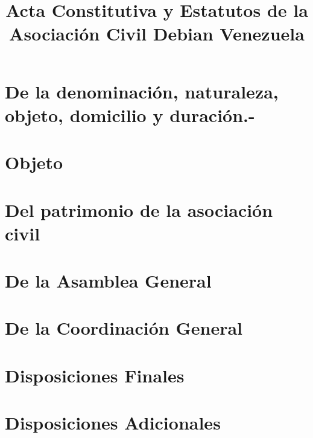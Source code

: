 \documentclass{article}
\title{Acta Constitutiva y Estatutos de la Asociaci\'on Civil Debian Venezuela}
\begin{document}
   

  \section{De la denominaci\'on, naturaleza, objeto, domicilio y duraci\'on.-}

    

  \section{Objeto}
  
     

  \section{Del patrimonio de la asociaci\'on civil}

    

  \section{De la Asamblea General}

    

  \section{De la Coordinaci\'on General}

    

  \section{Disposiciones Finales}

    

  \section{Disposiciones Adicionales}

    
\end{document}
